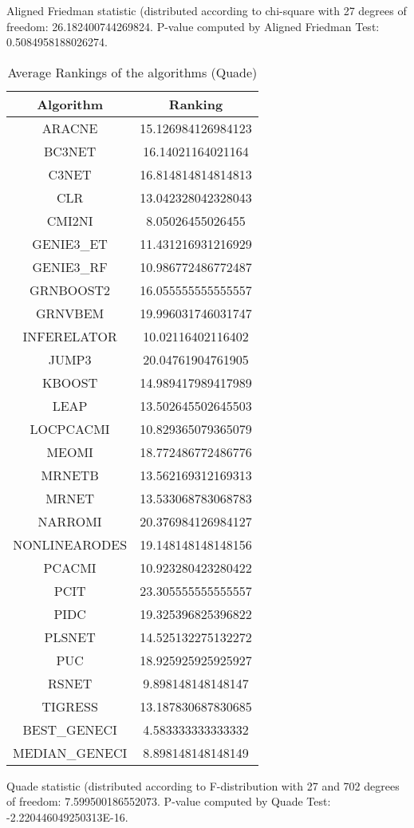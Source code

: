 \documentclass[a4paper,10pt]{article}
\begin{document}
\begin{landscape}
Aligned Friedman statistic (distributed according to chi-square with 27 degrees of freedom: 26.182400744269824. 
P-value computed by Aligned Friedman Test: 0.5084958188026274.\newline


\newpage

\begin{table}[!htp]
\centering
\caption{Average Rankings of the algorithms (Quade)
}\begin{tabular}{c|c}
Algorithm&Ranking\\
\hline
ARACNE&15.126984126984123\\
BC3NET&16.14021164021164\\
C3NET&16.814814814814813\\
CLR&13.042328042328043\\
CMI2NI&8.05026455026455\\
GENIE3_ET&11.431216931216929\\
GENIE3_RF&10.986772486772487\\
GRNBOOST2&16.055555555555557\\
GRNVBEM&19.996031746031747\\
INFERELATOR&10.02116402116402\\
JUMP3&20.04761904761905\\
KBOOST&14.989417989417989\\
LEAP&13.502645502645503\\
LOCPCACMI&10.829365079365079\\
MEOMI&18.772486772486776\\
MRNETB&13.562169312169313\\
MRNET&13.533068783068783\\
NARROMI&20.376984126984127\\
NONLINEARODES&19.148148148148156\\
PCACMI&10.923280423280422\\
PCIT&23.305555555555557\\
PIDC&19.325396825396822\\
PLSNET&14.525132275132272\\
PUC&18.925925925925927\\
RSNET&9.898148148148147\\
TIGRESS&13.187830687830685\\
BEST_GENECI&4.583333333333332\\
MEDIAN_GENECI&8.898148148148149\\
\end{tabular}
\end{table}
Quade statistic (distributed according to F-distribution with 27 and 702 degrees of freedom: 7.599500186552073. 
P-value computed by Quade Test: -2.220446049250313E-16.\newline



\end{landscape}
\end{document}
